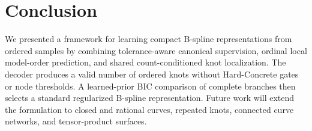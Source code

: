 \section{Conclusion}
\label{sec:conclusion}

We presented a framework for learning compact B-spline representations from
ordered samples by combining tolerance-aware canonical supervision, ordinal
local model-order prediction, and shared count-conditioned knot localization.
The decoder produces a valid number of ordered knots without Hard-Concrete
gates or node thresholds. A learned-prior BIC comparison of complete branches
then selects a standard regularized B-spline representation.
 Future work will extend the formulation to closed and
rational curves, repeated knots, connected curve networks, and tensor-product
surfaces.
